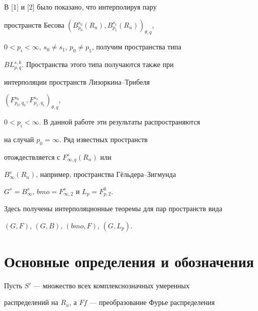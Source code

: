 \date{}




\pagestyle{plain} %







\maketitle


\label{begin}





В [1] и [2] было показано, что интерполируя пару


пространств Бесова $(B^{s_0}_{p_0}(R_n),B^{s_1}_{p_1}( R_n))_{\theta,q}$,


$0<p_i<\infty$, $s_0\ne s_1$, $p_0\ne p_1$, получим пространства типа


$BL^{s,k}_{p,q}$. Пространства этого типа получаются также при


интерполяции пространств Лизоркина--Трибеля


$(F^{s_0}_{p_0,q_0}, F^{s_1}_{p_1,q_1})_{\theta, q}$,


$0<p_i<\infty$. В данной работе эти результаты распространяются


на случай $p_0=\infty $. Ряд известных пространств


отождествляется с $F^s_{\infty,q}(R_n)$ или


$B^s_\infty(R_n)$, например, пространства Г\"ельдера--Зигмунда


$G^s=B^s_\infty$, $bmo=F^s_{\infty,2}$ и $L_p=F^0_{p,2}$.


Здесь получены интерполяционные теоремы для пар пространств вида


$(G,F)$, $(G,B)$, $(bmo, F)$, $(G,L_p)$.





\section{Основные определения и обозначения}


 


Пусть $S'$ --- множество всех комплекснозначных умеренных 


распределений на $R_n$, а $Ff$ --- преобразование Фурье распределения



